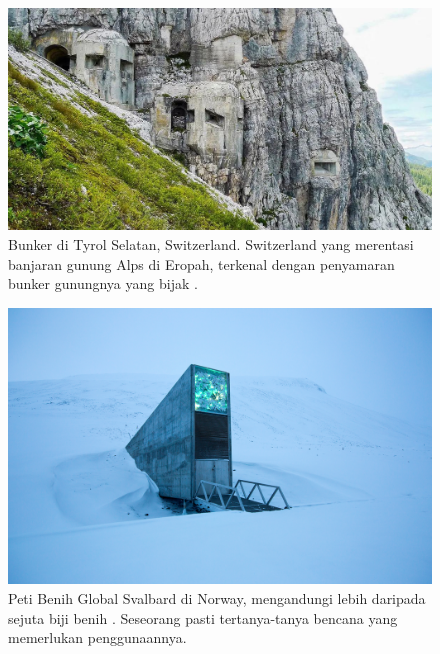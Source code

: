 \documentclass[10pt,twocolumn,letterpaper]{article}
\begin{document}
\begin{figure}[t]
\begin{center}
   \includegraphics[width=1\linewidth]{tyrol.jpg}
\end{center}
   \caption{Bunker di Tyrol Selatan, Switzerland. Switzerland yang merentasi banjaran gunung Alps di Eropah, terkenal dengan penyamaran bunker gunungnya yang bijak \cite{32}.}
\label{fig:7}
\label{fig:onecol}
\end{figure}

\begin{figure}[t]
\begin{center}
   \includegraphics[width=1\linewidth]{svalbard.jpg}
\end{center}
   \caption{Peti Benih Global Svalbard di Norway, mengandungi lebih daripada sejuta biji benih \cite{24}. Seseorang pasti tertanya-tanya bencana yang memerlukan penggunaannya.}
\label{fig:8}
\label{fig:onecol}
\end{figure}
\end{document}
